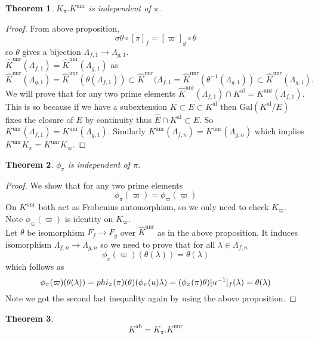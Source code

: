 \documentclass[twoside, 12pt]{iiser-thesis}
\newtheorem{thm}{Theorem}[section]
\newcommand{\gal}{\text{Gal}}
\newcommand{\un}{\text{unr}}
\newcommand{\al}{\text{al}}
\newcommand{\ab}{\text{ab}}
\begin{document}
\begin{thm}
$K_\pi . K^\un$ is independent of $\pi$.
\end{thm}
\begin{proof}From above proposition,
\[\sigma \theta \circ [\pi]_f=[\varpi ]_g \circ \theta \] so $\theta$ gives a bijection $ \Lambda _{f,1} \rightarrow \Lambda _{g,1}$. \\
$\hat K ^\un (\Lambda _{f,1})= \hat K ^\un (\Lambda _{g,1})$ as \[ \hat K ^\un (\Lambda _{g,1})= \hat K ^\un (\theta (\Lambda _{f,1})) \subset \hat K ^\un (\Lambda _{f,1} = \hat K ^\un (\theta ^{-1} (\Lambda _{g,1})) \subset \hat K ^\un (\Lambda _{g,1}).\]
We will prove that for any two prime elements $\hat K^ \un (\Lambda _{f,1}) \cap K^ \al = K^ \un (\Lambda _{f,1}) $. This is so because if we have a subextension $K\subset E \subset K^\al$ then $\gal (K^\al/E)$ fixes the closure of $E$ by continuity thus $ \hat E \cap K^\al \subset E$. So $K ^\un (\Lambda _{f,1}) = K ^\un (\Lambda _{g,1})$. Similarly $K ^\un (\Lambda _{f,n})= K^\un (\Lambda _{g,n})$ which implies $K^ \un K _\pi= K^ \un K_\varpi$.
\end{proof}
\begin{thm}
$\phi_\pi$ is independent of $\pi$.
\end{thm}
\begin{proof}
We show that for any two prime elements \[\phi _\pi(\varpi )=\phi _\varpi (\varpi )\]
On $K ^\un$ both act as Frobenius automorphism, so we only need to check $K_\varpi$. \\
Note $\phi _\varpi (\varpi)$ is identity on $K_\varpi$. \\
Let $\theta$ be isomorphism $F_f \rightarrow F_g$ over $\hat K ^\un$ as in the above proposition. It induces isomorphism $ \Lambda _{f,n} \rightarrow \Lambda _{g,n}$ so we need to prove that for all $\lambda \in \Lambda _{f,n}$ \[ \phi _\pi (\varpi ) (\theta (\lambda )) = \theta (\lambda )\]
which follows as \[ \phi _\pi (\varpi )(\theta (\lambda ))= \\phi _\pi (\pi ) (\theta)(\phi _\pi (u) \lambda )=(\phi_\pi (\pi) \theta )[u^{-1}]_f (\lambda)=\theta (\lambda) \] Note we got the second last inequality again by using the above proposition.
\end{proof}
\begin{thm}
\[K^\ab =K _\pi . K^\un \]
\end{thm}
\end{document}
